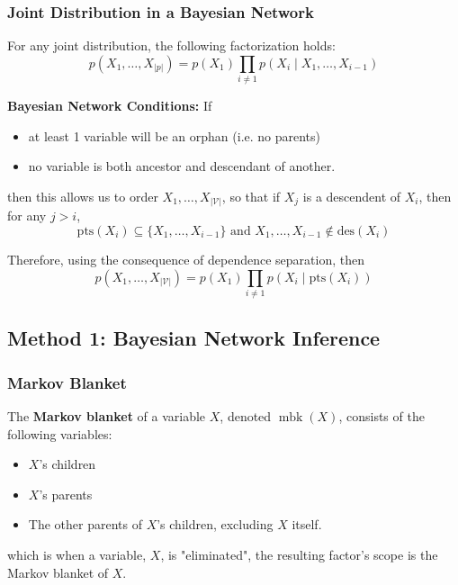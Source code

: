 \subsubsection{Joint Distribution in a Bayesian Network}
\begin{derivation}
    For any joint distribution, the following factorization holds:
    \begin{equation*}
        p(X_1,\ldots,X_{|p|})  = p(X_1) \prod_{i \neq 1} p(X_i \mid X_1,\ldots, X_{i-1})
    \end{equation*}

    \textbf{Bayesian Network Conditions:} If 
    \begin{itemize}
        \item at least 1 variable will be an orphan (i.e. no parents)
        \item no variable is both ancestor and descendant of another. 
    \end{itemize}
    \vspace{1em}

    then this allows us to order $X_1,\ldots,X_{|\mathcal{V}|}$,  so that if $X_j$ is a descendent of $X_i$, then for any $j > i$, 
    \begin{equation*}
        \text{pts}(X_i) \subseteq \{X_1,\ldots,X_{i-1}\} \text{ and } X_1,\ldots,X_{i-1} \notin \text{des}(X_i)
    \end{equation*}

    Therefore, using the consequence of dependence separation, then 
    \begin{equation*}
        p(X_1,\ldots,X_{|\mathcal{V}|}) = p(X_1) \prod_{i \neq 1} p(X_i \mid \text{pts}(X_i))
    \end{equation*}
\end{derivation}

\subsection{Method 1: Bayesian Network Inference}

\subsubsection{Markov Blanket}
\begin{definition} 
    The \textbf{Markov blanket} of a variable $X$, denoted $\operatorname{mbk}(X)$, consists of the following variables:
    \begin{itemize}
        \item $X$'s children
        \item $X$'s parents
        \item The other parents of $X$'s children, excluding $X$ itself.
    \end{itemize}
    which is when a variable, $X$, is "eliminated", the resulting factor's scope is the Markov blanket of $X$.
\end{definition}

